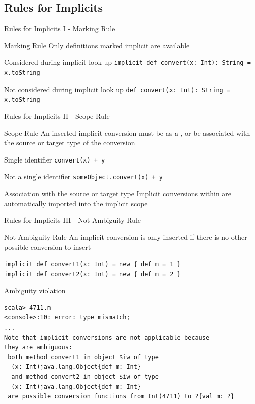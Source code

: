 \subsection{Rules for Implicits}
\begin{frame}[fragile]{Rules for Implicits I - Marking Rule}
\begin{block}{Marking Rule}
Only definitions marked implicit are available
\end{block}
\begin{exampleblock}{Considered during implicit look up}
\lstinline!implicit def convert(x: Int): String = x.toString!
\end{exampleblock}
\begin{alertblock}{Not considered during implicit look up}
\lstinline!def convert(x: Int): String = x.toString!
\end{alertblock}

\end{frame}

\begin{frame}[fragile]{Rules for Implicits II - Scope Rule}
\begin{block}{Scope Rule}
An inserted implicit conversion must be  as a
, or be associated with the source or target type
of the conversion
\end{block}
\begin{exampleblock}{Single identifier}
\lstinline!convert(x) + y!
\end{exampleblock}
\begin{alertblock}{Not a single identifier}
\lstinline!someObject.convert(x) + y!
\end{alertblock}
\begin{block}{Association with the source or target type}
Implicit conversions within  are automatically
imported into the implicit scope
\end{block}
\end{frame}

\begin{frame}[fragile]{Rules for Implicits III - Not-Ambiguity Rule}
\begin{block}{Not-Ambiguity Rule}
An implicit conversion is only inserted if there is no other possible conversion
to insert
\end{block}
\begin{lstlisting}
implicit def convert1(x: Int) = new { def m = 1 }
implicit def convert2(x: Int) = new { def m = 2 }
\end{lstlisting}
\begin{alertblock}{Ambiguity violation}
\begin{lstlisting}
scala> 4711.m
<console>:10: error: type mismatch;
...
Note that implicit conversions are not applicable because
they are ambiguous:
 both method convert1 in object $iw of type
  (x: Int)java.lang.Object{def m: Int}
  and method convert2 in object $iw of type
  (x: Int)java.lang.Object{def m: Int}
 are possible conversion functions from Int(4711) to ?{val m: ?}
\end{lstlisting}
\end{alertblock}
\end{frame}

